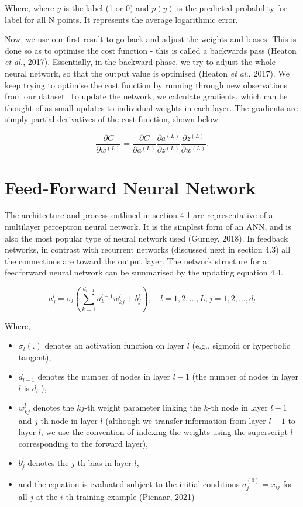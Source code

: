 Where, where $y$ is the label (1 or 0) and $p(y)$ is the predicted probability for label for all N points. It represents the average logarithmic error.

Now, we use our first result to go back and adjust the weights and biases. This is done so as to optimise the cost function - this is called a backwards pass (Heaton \textit{et al.}, 2017). Essentially, in the backward phase, we try to adjust the whole neural network, so that the output value is optimised (Heaton \textit{et al.}, 2017). We keep trying to optimise the cost function by running through new observations from our dataset. To update the network, we calculate gradients, which can be thought of as small updates to individual weights in each layer. The gradients are simply partial derivatives of the cost function, shown below:

\begin{equation}
\frac{\partial C}{\partial w^{(L)}}=\frac{\partial C}{\partial a^{(L)}} \frac{\partial a^{(L)}}{\partial z^{(L)}} \frac{\partial z^{(L)}}{\partial w^{(L)}} .
\end{equation}

\section{Feed-Forward Neural Network}

The architecture and process outlined in section 4.1 are representative of a multilayer perceptron neural network. It is the simplest form of an ANN, and is also the most popular type of neural network used (Gurney, 2018). In feedback networks, in contrast with recurrent networks (discussed next in section 4.3) all the connections are toward the output layer. The network structure for a feedforward neural network can be summarised by the updating equation 4.4.

\begin{equation}
a_{j}^{l}=\sigma_{l}\left(\sum_{k=1}^{d_{l-1}} a_{k}^{l-1} w_{k j}^{l}+b_{j}^{l}\right), \quad l=1,2, \ldots, L ; j=1,2, \ldots, d_{l}
\end{equation}

Where, 
\begin{itemize}
\item $\sigma_{l}(.)$ denotes an activation function on layer $l$ (e.g., sigmoid or hyperbolic tangent),
\item $d_{l-1}$ denotes the number of nodes in layer $l-1$ (the number of nodes in layer $l$ is $d_{l}$ ),
\item $w_{k j}^{l}$ denotes the $k j$-th weight parameter linking the $k$-th node in layer $l-1$ and $j$-th node in layer $l$ (although we transfer information from layer $l-1$ to layer $l$, we use the convention of indexing the weights using the superscript $l$-corresponding to the forward layer),
\item $b_{j}^{l}$ denotes the $j$-th bias in layer $l$,
\item and the equation is evaluated subject to the initial conditions $a_{j}^{(0)}=x_{i j}$ for all $j$ at the $i$-th training example (Pienaar, 2021)
\end{itemize}

